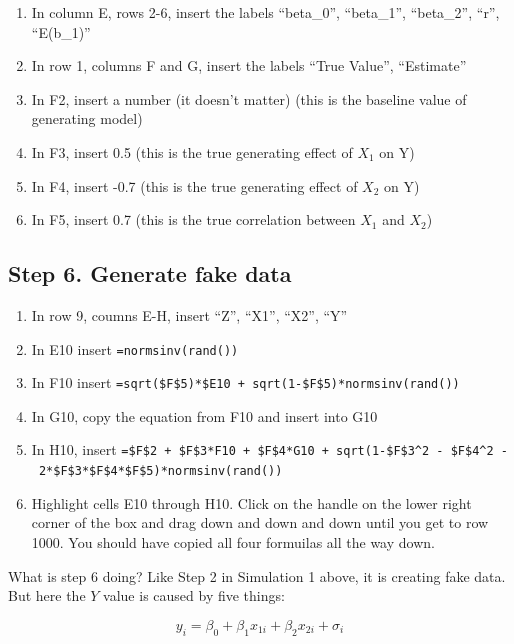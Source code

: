 \documentclass[]{book}
\providecommand{\tightlist}{%
  \setlength{\itemsep}{0pt}\setlength{\parskip}{0pt}}
\begin{document}
\begin{enumerate}
\def\labelenumi{\arabic{enumi}.}
\tightlist
\item
  In column E, rows 2-6, insert the labels ``beta\_0'', ``beta\_1'',
  ``beta\_2'', ``r'', ``E(b\_1)''
\item
  In row 1, columns F and G, insert the labels ``True Value'',
  ``Estimate''
\item
  In F2, insert a number (it doesn't matter) (this is the baseline value
  of generating model)
\item
  In F3, insert 0.5 (this is the true generating effect of \(X_1\) on Y)
\item
  In F4, insert -0.7 (this is the true generating effect of \(X_2\) on
  Y)
\item
  In F5, insert 0.7 (this is the true correlation between \(X_1\) and
  \(X_2\))
\end{enumerate}

\subsection{Step 6. Generate fake
data}\label{step-6.-generate-fake-data}

\begin{enumerate}
\def\labelenumi{\arabic{enumi}.}
\tightlist
\item
  In row 9, coumns E-H, insert ``Z'', ``X1'', ``X2'', ``Y''
\item
  In E10 insert \texttt{=normsinv(rand())}
\item
  In F10 insert
  \texttt{=sqrt(\$F\$5)*\$E10\ +\ sqrt(1-\$F\$5)*normsinv(rand())}
\item
  In G10, copy the equation from F10 and insert into G10
\item
  In H10, insert
  \texttt{=\$F\$2\ +\ \$F\$3*F10\ +\ \$F\$4*G10\ +\ sqrt(1-\$F\$3\^{}2\ -\ \$F\$4\^{}2\ -\ 2*\$F\$3*\$F\$4*\$F\$5)*normsinv(rand())}
\item
  Highlight cells E10 through H10. Click on the handle on the lower
  right corner of the box and drag down and down and down until you get
  to row 1000. You should have copied all four formuilas all the way
  down.
\end{enumerate}

What is step 6 doing? Like Step 2 in Simulation 1 above, it is creating
fake data. But here the \(Y\) value is caused by five things:

\begin{equation}
y_i = \beta_0 + \beta_1 x_{1i} + \beta_2 x_{2i} + \sigma_i
\end{equation}
\end{document}
